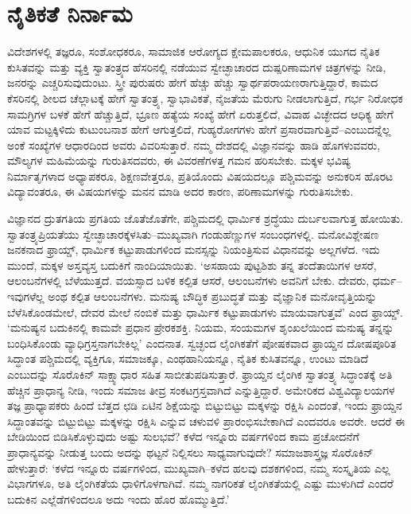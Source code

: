 \section*{ನೈತಿಕತೆ ನಿರ್ನಾಮ}


ವಿದೇಶಗಳಲ್ಲಿ ತಜ್ಞರೂ, ಸಂಶೋಧಕರೂ, ಸಾಮಾಜಿಕ ಆರೋಗ್ಯದ ಕ್ಷೇಮಪಾಲಕರೂ, ಆಧುನಿಕ ಯುಗದ ನೈತಿಕ ಕುಸಿತವನ್ನು ಮತ್ತು ವ್ಯಕ್ತಿ ಸ್ವಾತಂತ್ರ್ಯದ ಹೆಸರಿನಲ್ಲಿ ನಡೆಯುವ ಸ್ವೇಚ್ಛಾಚಾರದ ದುಷ್ಪರಿಣಾಮಗಳ ಚಿತ್ರಗಳನ್ನು ನೀಡಿ, ಜನರನ್ನು ಎಚ್ಚರಿಸುವುದುಂಟು. ಸ್ತ್ರೀ ಪುರುಷರು ಹೇಗೆ ಹೆಚ್ಚು ಹೆಚ್ಚು ಸ್ವಾರ್ಥಪರಾಯಣರಾಗುತ್ತಿದ್ದಾರೆ, ಕಾಮದ ಕೆಸರಿನಲ್ಲಿ ಶೀಲದ ಚೆಲ್ಲಾಟಕ್ಕೆ ಹೇಗೆ ಸ್ವಾತಂತ್ರ್ಯ, ಸ್ವಾಭಾವಿಕತೆ, ನೈಜತೆಯ ಮೆರುಗು ನೀಡಲಾಗುತ್ತಿದೆ, ಗರ್ಭ ನಿರೋಧಕ ಸಾಮಗ್ರಿಗಳ ಬಳಕೆ ಹೇಗೆ ಹೆಚ್ಚುತ್ತಿದೆ, ಭ್ರೂಣ ಹತ್ಯೆಯ ಸಂಖ್ಯೆ ಹೇಗೆ ಏರುತ್ತಲಿದೆ, ವಿವಾಹ ವಿಚ್ಛೇದದ ಆಧಿಕ್ಯ ಹೇಗೆ ಯಾವ ಮಟ್ಟಕ್ಕಿಳಿದು ಕುಟುಂಬನಾಶ ಹೇಗೆ ಆಗುತ್ತಲಿದೆ, ಗುಹ್ಯರೋಗಗಳು ಹೇಗೆ ಪ್ರಸಾರವಾಗುತ್ತಿವೆ–ಎಂಬುದನ್ನೆಲ್ಲ ಅಂಕೆ ಸಂಖ್ಯೆಗಳ ಆಧಾರದಿಂದ ಅವರು ವಿವರಿಸುತ್ತಾರೆ. ನಮ್ಮ ದೇಶದಲ್ಲಿ ವಿಜ್ಞಾನವನ್ನು ಹಾಡಿ ಹೊಗಳುವವರು, ಮೌಲ್ಯಗಳ ಮಹಿಮೆಯನ್ನು ಗುರುತಿಸದವರು, ಈ ವಿವರಣೆಗಳತ್ತ ಗಮನ ಹರಿಸಬೇಕು. ಮಕ್ಕಳ ಭವಿಷ್ಯ ನಿರ್ಮಾತೃಗಳಾದ ಅಧ್ಯಾಪಕರೂ, ಶಿಕ್ಷಣವೇತ್ತರೂ, ಪ್ರತಿಯೊಂದು ವಿಷಯದಲ್ಲೂ ಪಶ್ಚಿಮವನ್ನು ಅನುಕರಿಸ ಹೊರಟ ವಿದ್ಯಾ\-ವಂತರೂ, ಈ ವಿಷಯಗಳನ್ನು ಮನನ ಮಾಡಿ ಅದರ ಕಾರಣ, ಪರಿಣಾಮಗಳನ್ನು ಗುರುತಿಸಬೇಕು.

ವಿಜ್ಞಾನದ ದ್ರುತಗತಿಯ ಪ್ರಗತಿಯ ಜೊತೆಜೊತೆಗೇ, ಪಶ್ಚಿಮದಲ್ಲಿ ಧಾರ್ಮಿಕ ಶ್ರದ್ಧೆಯು ದುರ್ಬಲವಾಗುತ್ತ ಹೋಯಿತು. ಸ್ವಾತಂತ್ರ್ಯಪ್ರಿಯತೆಯು ಸ್ವೇಚ್ಛಾಚಾರಕ್ಕೆಳಸಿತು–ಮುಖ್ಯವಾಗಿ ಗಂಡುಹೆಣ್ಣುಗಳ ಸಂಬಂಧಗಳಲ್ಲಿ. ಮನೋವಿಶ್ಲೇಷಣ ಜನಕನಾದ ಫ್ರಾಯ್ಡ್, ಧಾರ್ಮಿಕ ಕಟ್ಟು\-ಪಾಡು\-ಗಳಿಂದ ಮನಸ್ಸನ್ನು ನಿಯಂತ್ರಿಸುವ ವಿಧಾನವನ್ನು ಅಲ್ಲಗಳೆದ. ಇದು ಮುಂದೆ, ಮಕ್ಕಳ ಅಸ್ತವ್ಯಸ್ತ ಬದುಕಿಗೆ ನಾಂದಿಯಾಯಿತು. ‘ಅಸಹಾಯ ಪುಟ್ಟಶಿಶು ತನ್ನ ತಂದೆತಾಯಿಗಳ ಆಸರೆ, ಆಲಂಬನೆಗಳಲ್ಲಿ ಬೆಳೆಯುತ್ತದೆ. ವಯಸ್ಸಾದ ಬಳಿಕ ಕಲ್ಪಿತ ಆಸರೆ, ಆಲಂಬನೆಗಳು ಅವನಿಗೆ ಬೇಕು. ದೇವರು, ಧರ್ಮ–ಇವುಗಳೆಲ್ಲ ಅಂಥ ಕಲ್ಪಿತ ಆಲಂಬನೆಗಳು. ಮನುಷ್ಯ ಬೌದ್ಧಿಕ ಪ್ರಬುದ್ಧತೆ ಮತ್ತು ವೈಜ್ಞಾನಿಕ ಮನೋವೃತ್ತಿಯನ್ನು ಬೆಳೆಸಿಕೊಂಡಮೇಲೆ, ದೇವರ ಮೇಲೆ ನಂಬಿಕೆ ಮತ್ತು ಧಾರ್ಮಿಕ ಕಟ್ಟುಪಾಡುಗಳು ಮಾಯವಾಗುತ್ತವೆ’ ಎಂದ ಫ್ರಾಯ್ಡ್. ‘ಮನುಷ್ಯನ ಬದುಕಿನಲ್ಲಿ ಕಾಮವೇ ಪ್ರಧಾನ ಪ್ರೇರಕಶಕ್ತಿ. ನಿಯಮ, ಸಂಯಮಗಳ ಶೃಂಖಲೆಯಿಂದ ಮನುಷ್ಯ ತನ್ನನ್ನು ಬಂಧಿಸಿಕೊಂಡು ವ್ಯಾಧಿಗ್ರಸ್ತನಾಗಬೇಕಿಲ್ಲ’ ಎಂದನಾತ. ಸ್ವಚ್ಛಂದ ಲೈಂಗಿಕತೆಗೆ ಪೋಷಕವಾದ ಫ್ರಾಯ್ಡನ ದೋಷಪೂರಿತ ಸಿದ್ಧಾಂತ ಪಶ್ಚಿಮದಲ್ಲಿ ವ್ಯಕ್ತಿಗೂ, ಸಮಾಜಕ್ಕೂ, ಎಂಥ\break ಹಾನಿಯನ್ನೂ, ನೈತಿಕ ಕುಸಿತವನ್ನೂ, ಉಂಟು ಮಾಡಿದೆ ಎಂಬುದನ್ನು ಸೊರೊಕಿನ್ ಸಾಕ್ಷ್ಯಾಧಾರ ಸಹಿತ ಸಾಬೀತುಪಡಿಸುತ್ತಾರೆ. ಫ್ರಾಯ್ಡನ ಲೈಂಗಿಕ ಸ್ವಾತಂತ್ರ್ಯ ಸಿದ್ಧಾಂತಕ್ಕೆ ಅತಿ ಹೆಚ್ಚಿನ ಪ್ರಾಧಾನ್ಯ ನೀಡಿ, ಇಂದು ಸಮಾಜ ತೀವ್ರ ಸಂಕಟಗ್ರಸ್ತವಾಗಿದೆ ಎನ್ನುತ್ತಿದ್ದಾರೆ. ಅಮೇರಿಕದ ವಿಶ್ವವಿದ್ಯಾಲಯಗಳ ತಜ್ಞ ಪ್ರಾಧ್ಯಾಪಕರು ಹಿಂದೆ ಬೆತ್ತದ ಛಡಿ ಏಟಿನ ಶಿಕ್ಷೆಯನ್ನು ಬಿಟ್ಟುಬಿಟ್ಟು ಮಕ್ಕಳನ್ನು ರಕ್ಷಿಸಿ ಎಂದಂತೆ, ಇಂದು ಫ್ರಾಯ್ಡನ ಸಿದ್ಧಾಂತವನ್ನು ಬಿಟ್ಟುಬಿಟ್ಟು ಮಕ್ಕಳನ್ನು ರಕ್ಷಿಸಿ ಎನ್ನುವ ಚಳುವಳಿ ಪ್ರಾರಂಭಿಸಬೇಕಾಗಿದೆ ಎಂದವರೂ ಅವರೇ. ಆದರೆ ಈ ಬೇಡಿಯಿಂದ ಬಿಡಿಸಿಕೊಳ್ಳುವುದು ಅಷ್ಟು ಸುಲಭವೆ? ಕಳೆದ ಇನ್ನೂರು ವರ್ಷಗಳಿಂದ ಕಾಮ ಪ್ರಚೋದನೆಗೆ ಪ್ರಾಧಾನ್ಯವನ್ನು ನೀಡುತ್ತ ಬಂದು ಅದನ್ನು ಥಟ್ಟನೆ ನಿಲ್ಲಿಸಲು ಸಾಧ್ಯವಾಗುವುದೇ? ಸಮಾಜಶಾಸ್ತ್ರಜ್ಞ ಸೊರೊಕಿನ್ ಹೇಳುತ್ತಾರೆ: ‘ಕಳೆದ ಇನ್ನೂರು ವರ್ಷಗಳಿಂದ, ಮುಖ್ಯವಾಗಿ–ಕಳೆದ ಹಲವು ದಶಕಗಳಿಂದ, ನಮ್ಮ ಸಂಸ್ಕೃತಿಯ ಎಲ್ಲ ವಿಭಾಗಗಳೂ, ಅತಿ ಲೈಂಗಿಕತೆಯ ಧಾಳಿಗೊಳಗಾಗಿವೆ. ನಮ್ಮ ನಾಗರಿಕತೆ ಲೈಂಗಿಕತೆಯಲ್ಲಿ ಎಷ್ಟು ಮುಳುಗಿದೆ ಎಂದರೆ ಬದುಕಿನ ಎಲ್ಲೆಡೆಗಳಿಂದಲೂ ಅದು ಇಂದು ಹೊರ ಹೊಮ್ಮುತ್ತಿದೆ.’

